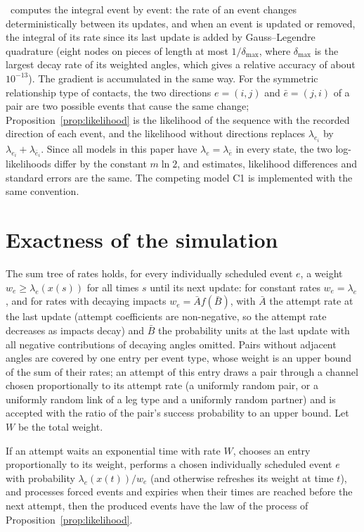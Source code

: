 \noindent \tricl\ computes the integral event by event: the rate of an event changes deterministically between its updates, and when an event is updated or removed, the integral of its rate since its last update is added by Gauss--Legendre quadrature (eight nodes on pieces of length at most $1/\delta_{\max}$, where $\delta_{\max}$ is the largest decay rate of its weighted angles, which gives a relative accuracy of about $10^{-13}$).
The gradient is accumulated in the same way.
For the symmetric relationship type of contacts, the two directions $e = (i, j)$ and $\bar e = (j, i)$ of a pair are two possible events that cause the same change; Proposition~\ref{prop:likelihood} is the likelihood of the sequence with the recorded direction of each event, and the likelihood without directions replaces $\lambda_{e_i}$ by $\lambda_{e_i} + \lambda_{\bar e_i}$.
Since all models in this paper have $\lambda_e = \lambda_{\bar e}$ in every state, the two log-likelihoods differ by the constant $m \ln 2$, and estimates, likelihood differences and standard errors are the same.
The competing model C1 is implemented with the same convention.

\section{Exactness of the simulation}\label{app:thinning}
The sum tree of rates holds, for every individually scheduled event $e$, a weight $w_e \ge \lambda_e(x(s))$ for all times $s$ until its next update: for constant rates $w_e = \lambda_e$, and for rates with decaying impacts $w_e = \bar A f(\bar B)$, with $\bar A$ the attempt rate at the last update (attempt coefficients are non-negative, so the attempt rate decreases as impacts decay) and $\bar B$ the probability units at the last update with all negative contributions of decaying angles omitted.
Pairs without adjacent angles are covered by one entry per event type, whose weight is an upper bound of the sum of their rates; an attempt of this entry draws a pair through a channel chosen proportionally to its attempt rate (a uniformly random pair, or a uniformly random link of a leg type and a uniformly random partner) and is accepted with the ratio of the pair's success probability to an upper bound.
Let $W$ be the total weight.

\begin{proposition}\label{prop:thinning}
If an attempt waits an exponential time with rate $W$, chooses an entry proportionally to its weight, performs a chosen individually scheduled event $e$ with probability $\lambda_e(x(t))/w_e$ (and otherwise refreshes its weight at time $t$), and processes forced events and expiries when their times are reached before the next attempt, then the produced events have the law of the process of Proposition~\ref{prop:likelihood}.
\end{proposition}


